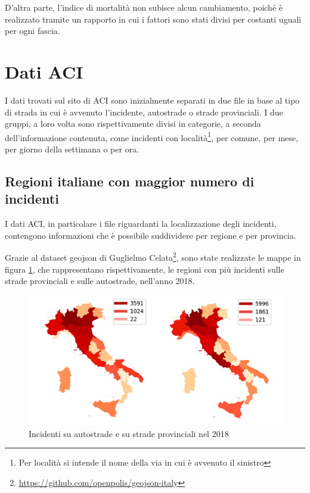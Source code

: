 \documentclass[a4paper,12pt]{report}
\begin{document}
D'altra parte, l'indice di mortalità non subisce alcun cambiamento, 
poiché è realizzato tramite 
un rapporto in cui i fattori sono stati divisi per costanti uguali per ogni fascia. 

\section{Dati ACI}

I dati trovati sul sito di ACI sono inizialmente separati in due file in 
base al tipo di strada in cui è avvenuto l'incidente, autostrade o strade provinciali. 
I due gruppi, a loro volta sono rispettivamente divisi in categorie, a seconda 
dell'informazione contenuta, come incidenti con 
località\footnote{Per località si intende il nome della via in cui è avvenuto il sinistro}, 
per comune, per mese, per giorno della settimana o per ora. 

\subsection{Regioni italiane con maggior numero di incidenti}

I dati ACI, in particolare i file riguardanti la 
localizzazione degli incidenti, contengono informazioni che è  
possibile suddividere per regione e per provincia. 

Grazie al dataset geojson di Guglielmo 
Celata\footnote{\url{https://github.com/openpolis/geojson-italy}}, 
sono state realizzate le mappe in figura \ref{fig:incidenti-per-regione}, 
che rappresentano rispettivamente, le regioni con più incidenti 
sulle strade provinciali e sulle autostrade, nell'anno 2018. 

\begin{figure}
    \includegraphics[width=\linewidth]{img_unite/incidenti_autostrade_provinciali.png}
    \caption{Incidenti su autostrade e su strade provinciali nel 2018}
    \label{fig:incidenti-per-regione}
\end{figure}
\end{document}
